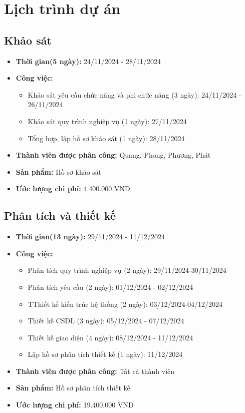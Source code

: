 \section{Lịch trình dự án}
\subsection{Khảo sát}
\begin{itemize}
    \item \textbf{Thời gian(5 ngày):} 24/11/2024 - 28/11/2024
    \item \textbf{Công việc:}
    \begin{itemize}
        \item Khảo sát yêu cầu chức năng và phi chức năng (3 ngày): 24/11/2024 - 26/11/2024
        \item Khảo sát quy trình nghiệp vụ (1 ngày): 27/11/2024
        \item Tổng hợp, lập hồ sơ khảo sát (1 ngày): 28/11/2024
    \end{itemize}
    \item \textbf{Thành viên được phân công:} Quang, Phong, Phương, Phát
    \item \textbf{Sản phẩm:} Hồ sơ khảo sát
    \item \textbf{Ước lượng chi phí:} 4.400.000 VND
\end{itemize}
\subsection{Phân tích và thiết kế}
\begin{itemize}
    \item \textbf{Thời gian(13 ngày):}  29/11/2024 - 11/12/2024
    \item \textbf{Công việc:}
    \begin{itemize}
        \item Phân tích quy trình nghiệp vụ (2 ngày): 29/11/2024-30/11/2024
        \item Phân tích yêu cầu (2 ngày): 01/12/2024 - 02/12/2024
        \item TThiết kế kiến trúc hệ thống (2 ngày): 03/12/2024-04/12/2024
        \item Thiết kế CSDL (3 ngày): 05/12/2024 - 07/12/2024
        \item Thiết kế giao diện (4 ngày): 08/12/2024 - 11/12/2024
        \item Lập hồ sơ phân tích thiết kế (1 ngày): 11/12/2024
    \end{itemize}
    \item \textbf{Thành viên được phân công:} Tất cả thành viên
    \item \textbf{Sản phẩm:} Hồ sơ phân tích thiết kế
    \item \textbf{Ước lượng chi phí:} 19.400.000 VND
\end{itemize}
